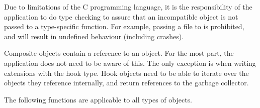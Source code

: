 Due to limitations of the C programming language, it is the responsibility of
the application to do type checking to assure that an incompatible
 object is not passed to a type-specific function.  For example,
passing a file  to  is prohibited, and
will result in undefined behaviour (including crashes).

Composite objects contain a reference to an  object.  For the
most part, the application does not need to be aware of this.  The only
exception is when writing extensions with the hook type.  Hook objects need to
be able to iterate over the objects they reference internally, and return
 references to the garbage collector.

The following functions are applicable to all types of  objects.

